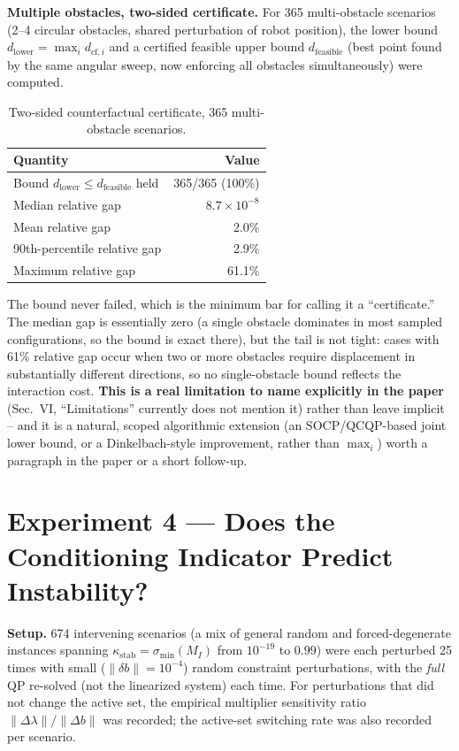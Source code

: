 \documentclass[11pt]{article}
\begin{document}
\textbf{Multiple obstacles, two-sided certificate.} For 365 multi-obstacle
scenarios (2--4 circular obstacles, shared perturbation of robot position),
the lower bound $d_{\mathrm{lower}}=\max_i d_{\mathrm{cf},i}$ and a certified
feasible upper bound $d_{\mathrm{feasible}}$ (best point found by the same
angular sweep, now enforcing all obstacles simultaneously) were computed.

\begin{table}[h]
\centering
\caption{Two-sided counterfactual certificate, 365 multi-obstacle scenarios.}
\begin{tabular}{lr}
\toprule
Quantity & Value \\
\midrule
Bound $d_{\mathrm{lower}}\le d_{\mathrm{feasible}}$ held & \cellcolor{ok!25}365/365 (100\%) \\
Median relative gap & $8.7\times10^{-8}$ \\
Mean relative gap & 2.0\% \\
90th-percentile relative gap & 2.9\% \\
Maximum relative gap & 61.1\% \\
\bottomrule
\end{tabular}
\end{table}

The bound never failed, which is the minimum bar for calling it a
``certificate.'' The median gap is essentially zero (a single obstacle
dominates in most sampled configurations, so the bound is exact there), but
the tail is not tight: cases with 61\% relative gap occur when two or more
obstacles require displacement in substantially different directions, so no
single-obstacle bound reflects the interaction cost. \textbf{This is a real
limitation to name explicitly in the paper} (Sec.~VI, ``Limitations''
currently does not mention it) rather than leave implicit -- and it is a
natural, scoped algorithmic extension (an SOCP/QCQP-based joint lower bound,
or a Dinkelbach-style improvement, rather than $\max_i$) worth a paragraph in
the paper or a short follow-up.

\section{Experiment 4 --- Does the Conditioning Indicator Predict Instability?}
\label{sec:exp4}

\textbf{Setup.} 674 intervening scenarios (a mix of general random and
forced-degenerate instances spanning $\kappa_{\mathrm{stab}}=\sigma_{\min}(M_I)$
from $10^{-19}$ to $0.99$) were each perturbed 25 times with small
($\|\delta b\|=10^{-4}$) random constraint perturbations, with the \emph{full}
QP re-solved (not the linearized system) each time. For perturbations that did
not change the active set, the empirical multiplier sensitivity ratio
$\|\Delta\lambda\|/\|\Delta b\|$ was recorded; the active-set switching rate
was also recorded per scenario.
\end{document}
